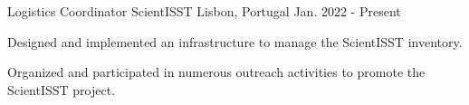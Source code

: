 

\begin{cventries}

  \cventry
    {Logistics Coordinator} %
    {ScientISST} %
    {Lisbon, Portugal} %
    {Jan. 2022 - Present} %
    {
      \begin{cvitems} %
        \item {Designed and implemented an infrastructure to manage the ScientISST inventory.}
        \item {Organized and participated in numerous outreach activities to promote the ScientISST project.}
      \end{cvitems}
    }


\end{cventries}
